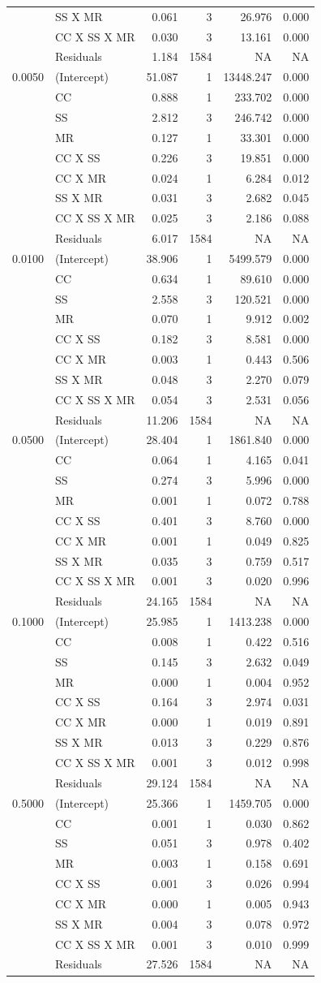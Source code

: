 \documentclass[double,11pt]{beavtex}
\begin{document}
\begin{longtable}[]{@{}llrrrr@{}}
  & SS X MR & 0.061 & 3 & 26.976 & 0.000\tabularnewline
  & CC X SS X MR & 0.030 & 3 & 13.161 & 0.000\tabularnewline
  & Residuals & 1.184 & 1584 & NA & NA\tabularnewline
  0.0050 & (Intercept) & 51.087 & 1 & 13448.247 & 0.000\tabularnewline
  & CC & 0.888 & 1 & 233.702 & 0.000\tabularnewline
  & SS & 2.812 & 3 & 246.742 & 0.000\tabularnewline
  & MR & 0.127 & 1 & 33.301 & 0.000\tabularnewline
  & CC X SS & 0.226 & 3 & 19.851 & 0.000\tabularnewline
  & CC X MR & 0.024 & 1 & 6.284 & 0.012\tabularnewline
  & SS X MR & 0.031 & 3 & 2.682 & 0.045\tabularnewline
  & CC X SS X MR & 0.025 & 3 & 2.186 & 0.088\tabularnewline
  & Residuals & 6.017 & 1584 & NA & NA\tabularnewline
  0.0100 & (Intercept) & 38.906 & 1 & 5499.579 & 0.000\tabularnewline
  & CC & 0.634 & 1 & 89.610 & 0.000\tabularnewline
  & SS & 2.558 & 3 & 120.521 & 0.000\tabularnewline
  & MR & 0.070 & 1 & 9.912 & 0.002\tabularnewline
  & CC X SS & 0.182 & 3 & 8.581 & 0.000\tabularnewline
  & CC X MR & 0.003 & 1 & 0.443 & 0.506\tabularnewline
  & SS X MR & 0.048 & 3 & 2.270 & 0.079\tabularnewline
  & CC X SS X MR & 0.054 & 3 & 2.531 & 0.056\tabularnewline
  & Residuals & 11.206 & 1584 & NA & NA\tabularnewline
  0.0500 & (Intercept) & 28.404 & 1 & 1861.840 & 0.000\tabularnewline
  & CC & 0.064 & 1 & 4.165 & 0.041\tabularnewline
  & SS & 0.274 & 3 & 5.996 & 0.000\tabularnewline
  & MR & 0.001 & 1 & 0.072 & 0.788\tabularnewline
  & CC X SS & 0.401 & 3 & 8.760 & 0.000\tabularnewline
  & CC X MR & 0.001 & 1 & 0.049 & 0.825\tabularnewline
  & SS X MR & 0.035 & 3 & 0.759 & 0.517\tabularnewline
  & CC X SS X MR & 0.001 & 3 & 0.020 & 0.996\tabularnewline
  & Residuals & 24.165 & 1584 & NA & NA\tabularnewline
  0.1000 & (Intercept) & 25.985 & 1 & 1413.238 & 0.000\tabularnewline
  & CC & 0.008 & 1 & 0.422 & 0.516\tabularnewline
  & SS & 0.145 & 3 & 2.632 & 0.049\tabularnewline
  & MR & 0.000 & 1 & 0.004 & 0.952\tabularnewline
  & CC X SS & 0.164 & 3 & 2.974 & 0.031\tabularnewline
  & CC X MR & 0.000 & 1 & 0.019 & 0.891\tabularnewline
  & SS X MR & 0.013 & 3 & 0.229 & 0.876\tabularnewline
  & CC X SS X MR & 0.001 & 3 & 0.012 & 0.998\tabularnewline
  & Residuals & 29.124 & 1584 & NA & NA\tabularnewline
  0.5000 & (Intercept) & 25.366 & 1 & 1459.705 & 0.000\tabularnewline
  & CC & 0.001 & 1 & 0.030 & 0.862\tabularnewline
  & SS & 0.051 & 3 & 0.978 & 0.402\tabularnewline
  & MR & 0.003 & 1 & 0.158 & 0.691\tabularnewline
  & CC X SS & 0.001 & 3 & 0.026 & 0.994\tabularnewline
  & CC X MR & 0.000 & 1 & 0.005 & 0.943\tabularnewline
  & SS X MR & 0.004 & 3 & 0.078 & 0.972\tabularnewline
  & CC X SS X MR & 0.001 & 3 & 0.010 & 0.999\tabularnewline
  & Residuals & 27.526 & 1584 & NA & NA\tabularnewline
  \bottomrule
  \end{longtable}
  
\end{document}

